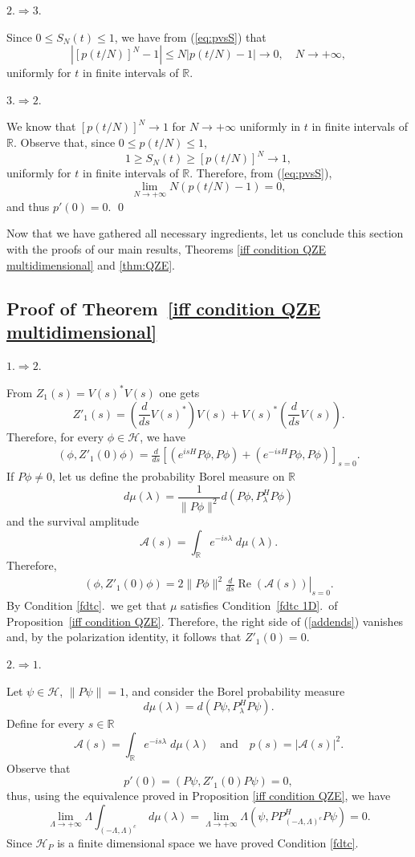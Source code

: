 \documentclass[aip,jmp
]{revtex4}
\renewcommand{\Re}{\mathop{\mathrm{Re}}\nolimits}
\newcommand{\RM}{\mathbb{R}}
\theoremstyle{definition}
\begin{document}
$2. \Rightarrow 3.$

Since $0 \leq S_{N}(t) \leq 1$, we have from (\ref{eq:pvsS}) that
$$
\left|[p(t/N)]^N -1 \right| \leq N \left|p(t/N)-1\right| \to 0, \quad N \to +\infty,
$$
uniformly for $t$ in finite intervals of $\RM$.

$3. \Rightarrow 2.$

We know that $[p(t/N)]^N \to 1$ for $N \to +\infty$ uniformly in $t$ in finite intervals of $\RM$.
Observe that, since $0\leq p(t/N)\leq 1$,
$$
1 \geq S_{N}(t) \geq [p(t/N)]^N \to 1,
$$
uniformly for $t$ in finite intervals of $\RM$. Therefore, from (\ref{eq:pvsS}),
$$
\lim_{N \to +\infty} N\left(p(t/N)-1\right)=0,
$$
and thus $p'(0)=0$.
\qed

Now that we have gathered all necessary ingredients, let us conclude this section with the proofs of our main results,  Theorems \ref{iff condition QZE multidimensional} and \ref{thm:QZE}.


\subsection*{Proof of Theorem~\ref{iff condition QZE multidimensional}}

$1. \Rightarrow 2.$ 

From $Z_1(s)=V(s)^{*}V(s)$ one gets
\[
Z'_1(s)=\left(\frac{d}{ds}V(s)^{*}\right)V(s)+V(s)^{*}\left(\frac{d}{ds}V(s)\right).
\]
Therefore, for every $\phi \in \mathcal{H}$, we have
\begin{eqnarray*}
(\phi,Z'_1(0)\phi) =  \frac{d}{ds} \left[\left( e^{isH}P\phi, P\phi\right) +\left( e^{-isH}P\phi, P\phi \right)\right]_{s=0} .
\end{eqnarray*}
If $P\phi\neq 0$, let us define the probability Borel measure on $\RM$
\[
d\mu(\lambda)=\frac{1}{\|P \phi\|^2}d(P\phi,P_{\lambda}^H P\phi)
\]
and the survival amplitude
\[
\mathcal{A}(s)=\int_{\RM}e^{-is\lambda} \; d\mu (\lambda).
\]
Therefore,
\begin{eqnarray}\label{addends}
(\phi,Z'_1(0)\phi) =2 \|P \phi\|^2 \left.\frac{d}{ds}\Re \left( \mathcal{A}(s) \right)  \right|_{s=0} .
\end{eqnarray}
By Condition \ref{fdtc}.\ we get that $\mu$ satisfies
Condition~\ref{fdtc 1D}.\ of Proposition~\ref{iff condition QZE}. Therefore, the right side of
(\ref{addends}) vanishes and, by the polarization identity, it follows that $Z'_1(0)=0$.

$2. \Rightarrow 1.$ 

Let $\psi \in \mathcal{H}$, $\| P \psi \|= 1$, and consider the
Borel probability measure
\[
d \mu (\lambda)= d(P \psi , P_{\lambda}^H P \psi).
\]
Define for every $s \in \RM$
\[
\mathcal{A}(s)=\int_{\RM} e^{-is \lambda}\; d\mu(\lambda) \quad
\textrm{and} \quad p(s)=|\mathcal{A}(s)|^2.
\]
Observe that
\[
p'(0)=(P\psi, Z'_1(0) P \psi)=0,
\]
thus, using the equivalence proved in Proposition \ref{iff condition
QZE}, we have
\[
\lim_{\Lambda \to + \infty} \Lambda \int_{(-\Lambda,\Lambda)^c}\; d\mu(\lambda)=\lim_{\Lambda \to + \infty} \Lambda (\psi,PP^{H}_{(-\Lambda,\Lambda)^c}P\psi)=0.
\]
Since $\mathcal{H}_{P}$ is a finite dimensional space we have proved Condition \ref{fdtc}.
\end{document}
